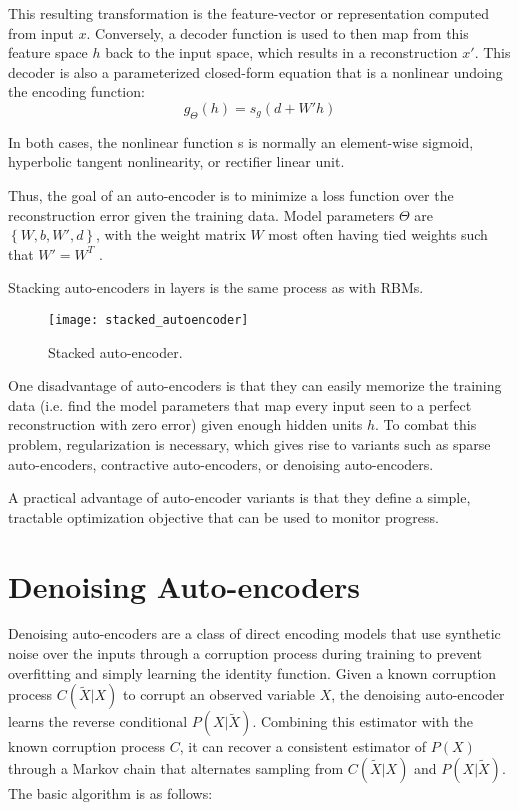 This resulting transformation is the feature-vector or representation computed from input \(x\).
Conversely, a decoder function is used to then map from this feature space \(h\) back to the input space, which results in a reconstruction \(x'\). This decoder is also a parameterized closed-form equation that is a nonlinear undoing the encoding function:
\[g_\Theta (h) = s_g (d + W' h)\]

In both cases, the nonlinear function s is normally an element-wise sigmoid, hyperbolic tangent nonlinearity, or rectifier linear unit.

Thus, the goal of an auto-encoder is to minimize a loss function over the reconstruction error given the training data. Model parameters \(\Theta\) are \(\left\{W,b,W',d\right\}\), with the weight matrix \(W\) most often having tied weights such that \(W' = W^T\) .

Stacking auto-encoders in layers is the same process as with RBMs.
\begin{figure}[h!]
  \centering
    \texttt{[image: stacked\_autoencoder]}
\caption{Stacked auto-encoder.}
\end{figure}

One disadvantage of auto-encoders is that they can easily memorize the training data (i.e. find the model parameters that map every input seen to a perfect reconstruction with zero error) given enough hidden units \(h\). To combat this problem, regularization is necessary, which gives rise to variants such as sparse auto-encoders, contractive auto-encoders, or denoising auto-encoders.

A practical advantage of auto-encoder variants is that they define a simple, tractable optimization objective that can be used to monitor progress.

\section{Denoising Auto-encoders}
Denoising auto-encoders \cite{bengio13a, vincent08, alain12} are a class of direct encoding models that use synthetic noise over the inputs through a corruption process during training to prevent overfitting and simply learning the identity function. Given a known corruption process \(C(\widetilde{X}|X)\) to corrupt an observed variable \(X\), the denoising auto-encoder learns the reverse conditional \(P(X|\widetilde{X})\). Combining this estimator with the known corruption process \(C\), it can recover a consistent estimator of \(P(X)\) through a Markov chain that alternates sampling from \(C(\widetilde{X}|X)\) and \(P(X|\widetilde{X})\). The basic algorithm is as follows:


